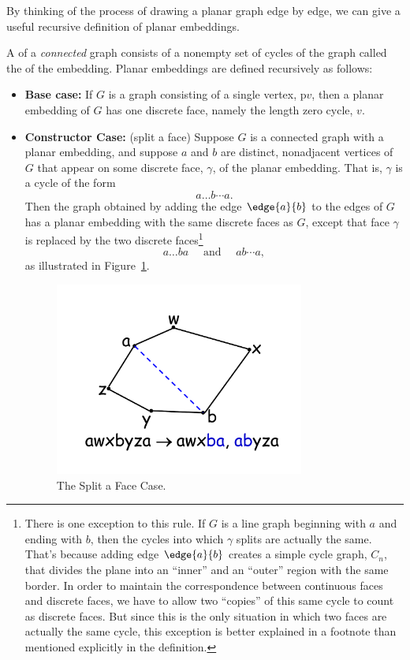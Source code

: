 By thinking of the process of drawing a planar graph edge by edge, we can
give a useful recursive definition of planar embeddings.

\begin{definition}\label{embeddingdef}
A  of a \emph{connected} graph consists of a
nonempty set of cycles of the graph called the  of
the embedding.  Planar embeddings are defined recursively as follows:

\begin{itemize}

\item \textbf{Base case:} If $G$ is a graph consisting of a single vertex,
p$v$, then a planar embedding of $G$ has one discrete face, namely the
length zero cycle, $v$.

\item \textbf{Constructor Case:} (split a face) Suppose $G$ is a
connected graph with a planar embedding, and suppose $a$ and $b$ are
distinct, nonadjacent vertices of $G$ that appear on some discrete face,
$\gamma$, of the planar embedding.  That is, $\gamma$ is a cycle of the form
\[
a \dots b \cdots a.
\]
Then the graph obtained by adding the edge $\edge{a}{b}$ to the edges of
$G$ has a planar embedding with the same discrete faces as $G$, except
that face $\gamma$ is replaced by the two discrete
faces\footnote{\label{C} There is one exception to this rule.  If $G$ is a
line graph beginning with $a$ and ending with $b$, then the cycles into
which $\gamma$ splits are actually the same.  That's because adding edge
$\edge{a}{b}$ creates a simple cycle graph, $C_n$, that divides the plane
into an ``inner'' and an ``outer'' region with the same border.  In order
to maintain the correspondence between continuous faces and discrete
faces, we have to allow two ``copies'' of this same cycle to count as
discrete faces.  But since this is the only situation in which two faces
are actually the same cycle, this exception is better explained in a
footnote than mentioned explicitly in the definition.}
\[
a\dots ba\quad \text{ and } \quad ab\cdots a, 
\]
as illustrated in Figure~\ref{fig:face-splitting}.

\begin{figure}[h]
\centering \includegraphics[height=2.5in]{figures/split-a-face}
\caption{The Split a Face Case.}
\label{fig:face-splitting}
\end{figure}


\end{itemize}
\end{definition}
